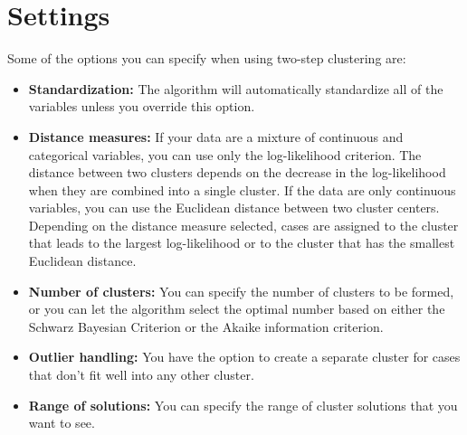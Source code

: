 \documentclass[a4paper,12pt]{article}
\begin{document}

\section*{Settings}
Some of the options you can specify when using two-step clustering are:

\begin{itemize}
	\item \textbf{Standardization:} The algorithm will automatically standardize all of the variables
	unless you override this option.
	\item \textbf{Distance measures:} If your data are a mixture of continuous and categorical variables,
	you can use only the log-likelihood criterion. The distance between two clusters
	depends on the decrease in the log-likelihood when they are combined into a single
	cluster. If the data are only continuous variables, you can use the Euclidean
	distance between two cluster centers. Depending on the distance measure selected,
	cases are assigned to the cluster that leads to the largest log-likelihood or to the cluster
	that has the smallest Euclidean distance.
	
	
\item \textbf{Number of clusters:} You can specify the number of clusters to be formed, or you can let
	the algorithm select the optimal number based on either the Schwarz Bayesian
	Criterion or the Akaike information criterion.
	
	
\item \textbf{Outlier handling:} You have the option to create a separate cluster for cases that don't fit
	well into any other cluster.
	\item 
	\textbf{Range of solutions:} You can specify the range of cluster solutions that you want to see.
\end{itemize}
\end{document}
